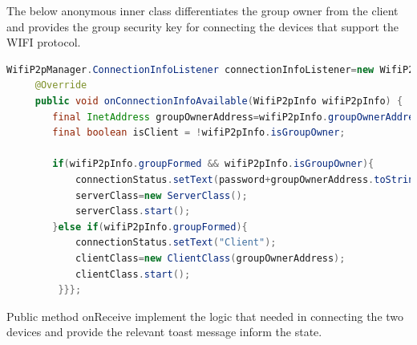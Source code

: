 The below anonymous inner class differentiates the group owner from the client and provides the group security key for connecting the devices that support the WIFI protocol.

\begin{lstlisting}[language=Java]
WifiP2pManager.ConnectionInfoListener connectionInfoListener=new WifiP2pManager.ConnectionInfoListener() {
     @Override
     public void onConnectionInfoAvailable(WifiP2pInfo wifiP2pInfo) {
        final InetAddress groupOwnerAddress=wifiP2pInfo.groupOwnerAddress;
        final boolean isClient = !wifiP2pInfo.isGroupOwner;
        
        if(wifiP2pInfo.groupFormed && wifiP2pInfo.isGroupOwner){
            connectionStatus.setText(password+groupOwnerAddress.toString());
            serverClass=new ServerClass();
            serverClass.start();
        }else if(wifiP2pInfo.groupFormed){
            connectionStatus.setText("Client");
            clientClass=new ClientClass(groupOwnerAddress);
            clientClass.start();
         }}};	
\end{lstlisting}
Public method onReceive implement the logic that needed in connecting the two devices and provide the relevant toast message inform the state.

